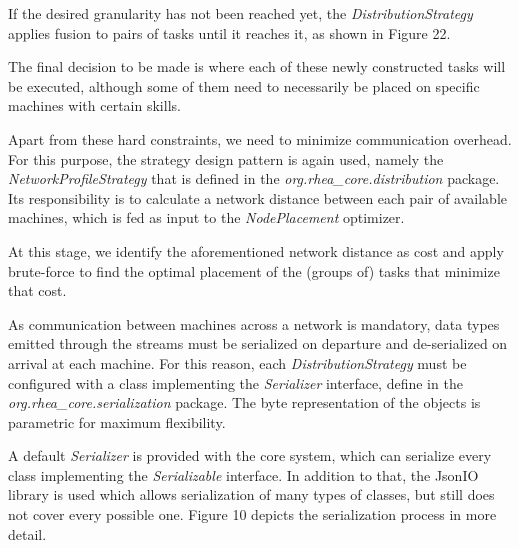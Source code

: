 \documentclass{dithesis}
\begin{document}
If the desired granularity has not been reached yet, the \textit{DistributionStrategy} applies fusion to pairs of tasks until it reaches it, as shown in Figure 22.


The final decision to be made is where each of these newly constructed tasks will be executed, although some of them need to necessarily be placed on specific machines with certain skills. 

Apart from these hard constraints, we need to minimize communication overhead. For this purpose, the strategy design pattern is again used, namely the \textit{NetworkProfileStrategy} that is defined in the \textit{org.rhea\_core.distribution} package. Its responsibility is to calculate a network distance between each pair of available machines, which is fed as input to the \textit{NodePlacement} optimizer. 

At this stage, we identify the aforementioned network distance as cost and apply brute-force to find the optimal placement of the (groups of) tasks that minimize that cost.


As communication between machines across a network is mandatory, data types emitted through the streams must be serialized on departure and de-serialized on arrival at each machine. For this reason, each \textit{DistributionStrategy} must be configured with a class implementing the \textit{Serializer} interface, define in the \textit{org.rhea\_core.serialization} package. The byte representation of the objects is parametric for maximum flexibility. 

A default \textit{Serializer} is provided with the core system, which can serialize every class implementing the \textit{Serializable} interface. In addition to that, the JsonIO library is used which allows serialization of many types of classes, but still does not cover every possible one. Figure 10 depicts the serialization process in more detail.




\end{document}
